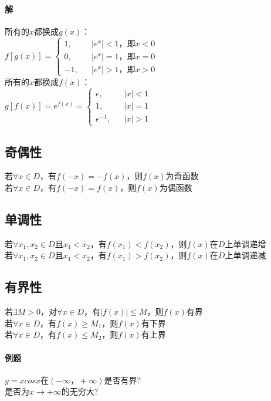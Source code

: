 \documentclass{article}
\begin{document}
\begin{flushleft}
	\paragraph{解}
	所有的$x$都换成$g(x)$：\\
	$f[g(x)]=\left\{
	\begin{array}{rcl}
		1,& & |e^x|<1，\mbox{即}x<0\\
		0,& & |e^x|=1，\mbox{即}x=0\\
		-1,& & |e^x|>1，\mbox{即}x>0
	\end{array} \right.$\\
	所有的$x$都换成$f(x)$：\\
	$g[f(x)]=e^{f(x)}=\left\{
	\begin{array}{rcl}
		e,& & |x|<1\\
		1,& & |x|=1\\
		e^{-1},& & |x|>1
	\end{array} \right.$\\
	
	\subsection{奇偶性}
	若$\forall x\in D$，有$f(-x)=-f(x)$，则$f(x)$为奇函数\\
	若$\forall x\in D$，有$f(-x)=f(x)$，则$f(x)$为偶函数\\
	
	\subsection{单调性}
	若$\forall x_1,x_2\in D$且$x_1<x_2$，有$f(x_1)<f(x_2)$，则$f(x)$在$D$上单调递增\\
	若$\forall x_1,x_2\in D$且$x_1<x_2$，有$f(x_1)>f(x_2)$，则$f(x)$在$D$上单调递减\\
	
	\subsection{有界性}
	若$\exists M>0$，对$\forall x\in D$，有$|f(x)|\le M$，则$f(x)$有界\\
	\qquad 若$\forall x\in D$，有$f(x)\ge M_1$，则$f(x)$有下界\\
	\qquad 若$\forall x\in D$，有$f(x)\le M_2$，则$f(x)$有上界\\
	
	\paragraph{例题}
	$y=xcosx$在$(-\infty，+\infty)$是否有界?\\
	是否为$x\to +\infty$的无穷大?

\end{flushleft}
\end{document}
